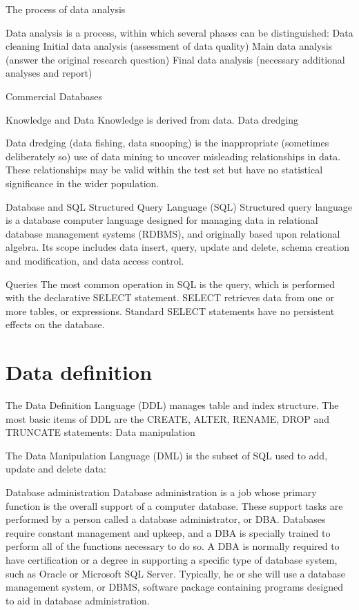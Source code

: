 The process of data analysis

Data analysis is a process, within which several phases can be distinguished:
Data cleaning
Initial data analysis (assessment of data quality)
Main data analysis (answer the original research question)
Final data analysis (necessary additional analyses and report)



Commercial Databases

Knowledge and Data
Knowledge is derived from data.
Data dredging

Data dredging (data fishing, data snooping) is the inappropriate (sometimes deliberately so) use of data mining to uncover misleading relationships in data. These relationships may be valid within the test set but have no statistical significance in the wider population.

Database and SQL
Structured Query Language (SQL) 
Structured query language is a database computer language designed for managing data in relational database management systems (RDBMS), and originally based upon relational algebra. Its scope includes data insert, query, update and delete, schema creation and modification, and data access control. 

Queries
The most common operation in SQL is the query, which is performed with the declarative SELECT statement. SELECT retrieves data from one or more tables, or expressions. Standard SELECT statements have no persistent effects on the database. 

\section{Data definition}
The Data Definition Language (DDL) manages table and index structure. The most basic items of DDL are the CREATE, ALTER, RENAME, DROP and TRUNCATE statements:
Data manipulation

The Data Manipulation Language (DML) is the subset of SQL used to add, update and delete data:

Database administration
Database administration is a job whose primary function is the overall support of a computer database. These support tasks are performed by a person called a database administrator, or DBA. Databases require constant management and upkeep, and a DBA is specially trained to perform all of the functions necessary to do so. A DBA is normally required to have certification or a degree in supporting a specific type of database system, such as Oracle or Microsoft SQL Server. Typically, he or she will use a database management system, or DBMS, software package containing programs designed to aid in database administration.

